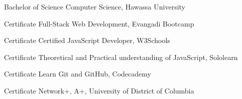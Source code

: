 

\begin{cvhonors}

  \cvhonor
    {Bachelor of Science} %
    {Computer Science, Hawassa University} %
    {} %
    {} %

  \cvhonor
    {Certificate} %
    {Full-Stack Web Development, Evangadi Bootcamp} %
    {} %
    {} %

  \cvhonor
    {Certificate} %
    {Certified JavaScript Developer, W3Schools} %
    {} %
    {} %
    
  \cvhonor
    {Certificate} %
    {Theoretical and Practical understanding of JavaScript, Sololearn} %
    {} %
    {} %
    
  \cvhonor
    {Certificate} %
    {Learn Git and GitHub, Codecademy} %
    {} %
    {} %

  \cvhonor
    {Certificate} %
    {Network+, A+, University of District of Columbia} %
    {} %
    {} %

\end{cvhonors}
